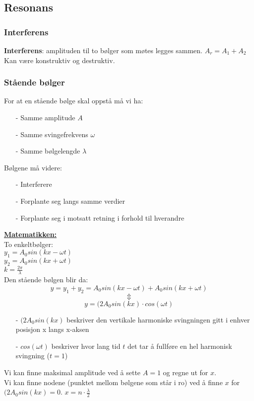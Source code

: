 \documentclass[12pt]{article}
\begin{document}
\subsection{Resonans}
\subsubsection{Interferens}
\textbf{Interferens}: amplituden til to bølger som møtes legges sammen. $A_r = A_1+ A_2$\\
Kan være konstruktiv og destruktiv.\\

\subsubsection{Stående bølger}
For at en stående bølge skal oppstå må vi ha:
\begin{itemize}
    \item[-] Samme amplitude $A$
    \item[-] Samme svingefrekvens $\omega$
    \item[-] Samme bølgelengde $\lambda$
\end{itemize}
Bølgene må videre:
\begin{itemize}
    \item[-] Interferere
    \item[-] Forplante seg langs samme verdier
    \item[-] Forplante seg i motsatt retning i forhold til hverandre
\end{itemize}
\textbf{\underline{Matematikken:}}\\
\bigskip
To enkeltbølger:\\
$y_1 = A_0sin(kx-\omega t)$\\
$y_2 = A_0 sin(kx+\omega t)$\\
$k = \frac{2\pi}{\lambda}$\\
\bigskip
Den stående bølgen blir da:
$$y = y_1+y_2 = A_0sin(kx-\omega t) +  A_0 sin(kx+\omega t)$$
$$\Updownarrow$$
$$y = (2A_0sin(kx)\cdot cos(\omega t)$$
\begin{itemize}
    \item [-] $(2A_0sin(kx)$ beskriver den vertikale harmoniske svingningen gitt i enhver posisjon x langs x-aksen
    \item [-] $cos(\omega t)$ beskriver hvor lang tid $t$ det tar å fullføre en hel harmonisk svingning ($t=1$)
\end{itemize}

Vi kan finne maksimal amplitude ved å sette $A = 1$ og regne ut for $x$.\\
Vi kan finne nodene (punktet mellom bølgene som står i ro) ved å finne $x$ for $(2A_0sin(kx) = 0$. $x = n\cdot \frac{\lambda}{2}$
\end{document}
